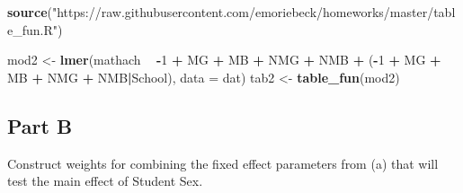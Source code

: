 \documentclass[]{article}
\newenvironment{Shaded}{\begin{snugshade}}{\end{snugshade}}
\newcommand{\KeywordTok}[1]{\textcolor[rgb]{0.13,0.29,0.53}{\textbf{#1}}}
\newcommand{\DataTypeTok}[1]{\textcolor[rgb]{0.13,0.29,0.53}{#1}}
\newcommand{\DecValTok}[1]{\textcolor[rgb]{0.00,0.00,0.81}{#1}}
\newcommand{\StringTok}[1]{\textcolor[rgb]{0.31,0.60,0.02}{#1}}
\newcommand{\OtherTok}[1]{\textcolor[rgb]{0.56,0.35,0.01}{#1}}
\newcommand{\OperatorTok}[1]{\textcolor[rgb]{0.81,0.36,0.00}{\textbf{#1}}}
\newcommand{\NormalTok}[1]{#1}
\begin{document}
\begin{Shaded}
\begin{Highlighting}[]
\KeywordTok{source}\NormalTok{(}\StringTok{"https://raw.githubusercontent.com/emoriebeck/homeworks/master/table_fun.R"}\NormalTok{)}

\NormalTok{mod2 <-}\StringTok{ }\KeywordTok{lmer}\NormalTok{(mathach }\OperatorTok{~}\StringTok{ }\OperatorTok{-}\DecValTok{1} \OperatorTok{+}\StringTok{ }\NormalTok{MG }\OperatorTok{+}\StringTok{ }\NormalTok{MB }\OperatorTok{+}\StringTok{ }\NormalTok{NMG }\OperatorTok{+}\StringTok{ }\NormalTok{NMB }\OperatorTok{+}\StringTok{ }\NormalTok{(}\OperatorTok{-}\DecValTok{1} \OperatorTok{+}\StringTok{ }\NormalTok{MG }\OperatorTok{+}\StringTok{ }\NormalTok{MB }\OperatorTok{+}\StringTok{ }\NormalTok{NMG }\OperatorTok{+}\StringTok{ }\NormalTok{NMB}\OperatorTok{|}\NormalTok{School), }\DataTypeTok{data =}\NormalTok{ dat)}
\NormalTok{tab2 <-}\StringTok{ }\KeywordTok{table_fun}\NormalTok{(mod2)}
\end{Highlighting}
\end{Shaded}

\subsection{Part B}\label{part-b}

Construct weights for combining the fixed effect parameters from (a)
that will test the main effect of Student Sex.

\begin{Shaded}
\end{Shaded}
\end{document}
